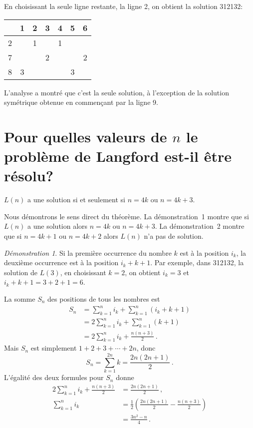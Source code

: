 En choisissant la seule ligne restante, la ligne 2, on obtient la solution 3{}1{}2{}1{}3{}2:
\begin{center}
\addtolength{\tabcolsep}{4pt}
\begin{tabular}{|c||c|c|c|c|c|c|}
\hline
&1&2&3&4&5&6\\\hline\hline
2&&1&&1&&\\\hline
7&&&2&&&2\\\hline
8&3&&&&3&\\\hline
\end{tabular}
\end{center}
L'analyse a montré que c'est la seule solution, à l'exception de la solution symétrique obtenue en commençant par la ligne 9.

\section{Pour quelles valeurs de $n$ le problème de Langford est-il être résolu?}\label{s.langford-theorem}

\begin{theorem} \label{thm.langford}
$L(n)$ a une solution si et seulement si $n=4k$ ou $n=4k+3$.
\end{theorem}

Nous démontrons le sens direct du théorème. La démonstration~1 montre que si $L(n)$ a une solution alors $n=4k$ ou $n=4k+3$. La démonstration~2 montre que si $n=4k+1$ ou $n=4k+2$ alors $L(n)$ n'a pas de solution.

\noindent \emph{Démonstration 1}. Si la première occurrence du nombre $k$ est à la position $i_k$, la deuxième occurrence est à la position $i_k+k+1$. Par exemple, dans 3{}1{}2{}1{}3{}2, la solution de $L(3)$, en choisissant $k=2$, on obtient $i_k=3$ et $i_k+k+1=3+2+1=6$.

 La somme $S_n$ des positions de tous les nombres est 
\begin{align*}
S_n&=\sum_{k=1}^{n}i_k+\sum_{k=1}^{n}(i_k+k+1)\\
& = 2\sum_{k=1}^{n}i_k+\sum_{k=1}^{n}(k+1)\\
&= 2\sum_{k=1}^{n}i_k+\frac{n(n+3)}{2}\,.
\end{align*}
Mais $S_n$ est simplement $1+2+3+\cdots+2n$, donc 
\[
S_n=\sum_{k=1}^{2n}k = \frac{2n(2n+1)}{2}\,.
\]
L'égalité des deux formules pour $S_n$ donne 
\begin{align*}
2\sum_{k=1}^{n}i_k+\frac{n(n+3)}{2} &= \frac{2n(2n+1)}{2}\,,\\
\sum_{k=1}^{n}i_k &= \frac{1}{2}\left(\frac{2n(2n+1)}{2} - \frac{n(n+3)}{2}\right) \\
&= \frac{3n^2-n}{4}\,.
\end{align*}

